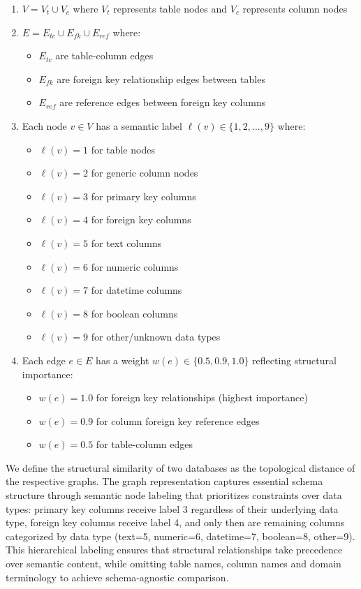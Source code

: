 \begin{enumerate}
    \item $V = V_t \cup V_c$ where $V_t$ represents table nodes and $V_c$ represents column nodes
    \item $E = E_{tc} \cup E_{fk} \cup E_{ref}$ where:
        \begin{itemize}
            \item $E_{tc}$ are table-column edges
            \item $E_{fk}$ are foreign key relationship edges between tables
            \item $E_{ref}$ are reference edges between foreign key columns
        \end{itemize}
    \item Each node $v \in V$ has a semantic label $\ell(v) \in \{1, 2, \ldots, 9\}$ where:
        \begin{itemize}
            \item $\ell(v) = 1$ for table nodes
            \item $\ell(v) = 2$ for generic column nodes
            \item $\ell(v) = 3$ for primary key columns
            \item $\ell(v) = 4$ for foreign key columns
            \item $\ell(v) = 5$ for text columns
            \item $\ell(v) = 6$ for numeric columns
            \item $\ell(v) = 7$ for datetime columns
            \item $\ell(v) = 8$ for boolean columns
            \item $\ell(v) = 9$ for other/unknown data types
        \end{itemize}
    \item Each edge $e \in E$ has a weight $w(e) \in \{0.5, 0.9, 1.0\}$ reflecting structural importance:
        \begin{itemize}
            \item $w(e) = 1.0$ for foreign key relationships (highest importance)
            \item $w(e) = 0.9$ for column foreign key reference edges
            \item $w(e) = 0.5$ for table-column edges
        \end{itemize}
\end{enumerate}

We define the structural similarity of two databases as the topological distance
of the respective graphs. The graph representation captures essential schema
structure through semantic node labeling that prioritizes constraints over data
types: primary key columns receive label 3 regardless of their underlying data
type, foreign key columns receive label 4, and only then are remaining columns
categorized by data type (text=5, numeric=6, datetime=7, boolean=8, other=9).
This hierarchical labeling ensures that structural relationships take
precedence over semantic content, while omitting table names, column names and
domain terminology to achieve schema-agnostic comparison.

